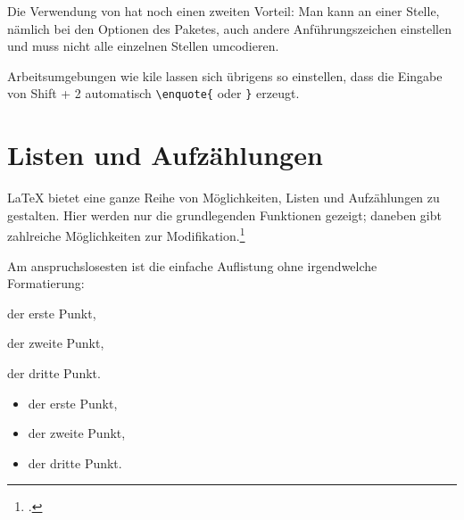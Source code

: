 Die Verwendung von  hat noch einen zweiten Vorteil:
Man kann an einer Stelle, nämlich bei den Optionen des Paketes, auch andere Anführungszeichen 
einstellen und muss nicht alle einzelnen Stellen umcodieren.

Arbeitsumgebungen wie kile lassen sich übrigens so einstellen, dass die Eingabe von Shift + 2
automatisch \lstinline/\enquote{/ oder \lstinline/}/ erzeugt.






\cite{voss:dtk2011/1}



\section{Listen und Aufzählungen}

\LaTeX{} bietet eine ganze Reihe von Möglichkeiten, Listen und Aufzählungen zu gestalten.
Hier werden nur die grundlegenden Funktionen gezeigt; daneben gibt zahlreiche Möglichkeiten zur
Modifikation.\footcite[295\psqq]{voss:einfuehrung}



Am anspruchslosesten ist die einfache Auflistung ohne irgendwelche Formatierung:

\begin{lfgwexample}{}
\begin{trivlist}
 \item der erste Punkt,
 \item der zweite Punkt,
 \item der dritte Punkt.
\end{trivlist} 
\end{lfgwexample}



\begin{lfgwexample}{}
\begin{itemize}
 \item der erste Punkt,
 \item der zweite Punkt,
 \item der dritte Punkt.
\end{itemize} 
\end{lfgwexample}

